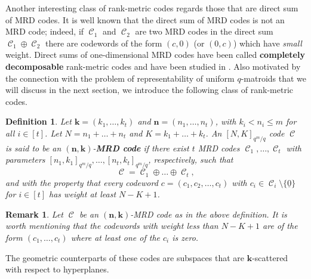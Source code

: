 \documentclass[11pt]{amsart}
\DeclareMathOperator{\C}{\mathcal{C}}
\newtheorem{definition}[theorem]{Definition}
\newtheorem{remark}[theorem]{Remark}
\begin{document}
Another interesting class of rank-metric codes regards those that are direct sum of MRD codes. It is well known that the direct sum of MRD codes is not an MRD code; indeed, if $\C_1$ and $\C_2$ are two MRD codes in the direct sum $\C_1\oplus\C_2$ there are codewords of the form $(c,0)$ (or $(0,c)$) which have \emph{small} weight. 
Direct sums of one-dimensional MRD codes have been called \textbf{completely decomposable} rank-metric codes and have been studied in \cite{santonastaso2024completely}.
Also motivated by the connection with the problem of representability of uniform $q$-matroids that we will discuss in the next section, we introduce the following class of rank-metric codes. 

\begin{definition}
    Let ${\mathbf k}=(k_1,\ldots,k_t)$ and  ${\mathbf n}=(n_1,\ldots,n_t)$, with $k_i<n_i\leq m$ for all $i\in [t]$. 
    Let $N=n_1+\ldots+n_t$ and $K=k_1+\ldots+k_t$.
    An $[N,K]_{q^m/q}$ code $\C$ is said to be an $(\mathbf{n},\mathbf{k})$-\textbf{MRD code} if there exist $t$ MRD codes $\C_1,\ldots,\C_t$ with parameters $[n_1,k_1]_{q^m/q},\ldots,[n_t,k_t]_{q^m/q}$, respectively, such that
    \[\C=\C_1\oplus \ldots\oplus\C_t,\]
    and with the property that every codeword $c =(c_1,c_2,\dots, c_t)$ with $c_i \in \C_i\setminus \{\underline 0\}$ for $i \in [t]$  has weight at least $N-K+1$.
\end{definition}

\begin{remark}\label{rem:smallweightcodewords(n,k)-MRD}
    Let $\C$ be an $(\mathbf{n},\mathbf{k})$-{MRD code} as in the above definition. 
    It is worth mentioning that the codewords with weight less than $N-K+1$ are of the form $(c_1,\ldots,c_t)$ where at least one of the $c_i$ is  zero.
\end{remark}

The geometric counterparts of these codes are subspaces that are $\mathbf{k}$-scattered with respect to hyperplanes.
\end{document}
